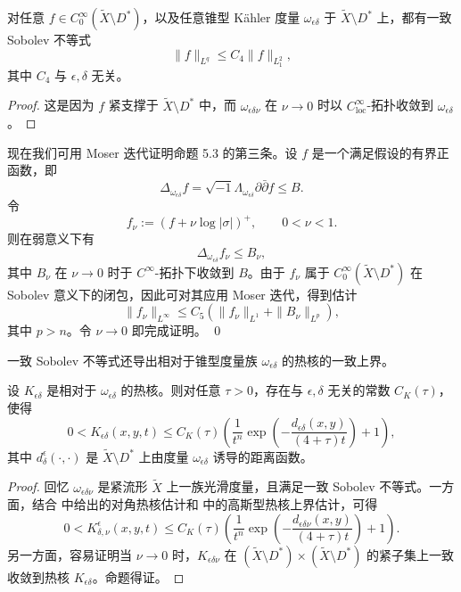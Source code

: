 \begin{lemma}
对任意 \(f\in C_0^\infty(\widetilde X\setminus D^*)\)，以及任意锥型 Kähler 度量 \(\omega_{\epsilon\delta}\) 于 \(\widetilde X\setminus D^*\) 上，都有一致 Sobolev 不等式
\[
\|f\|_{L^q}\le C_4\|f\|_{L_1^2},
\]
其中 \(C_4\) 与 \(\epsilon,\delta\) 无关。
\end{lemma}

\begin{proof}
这是因为 \(f\) 紧支撑于 \(\widetilde X\setminus D^*\) 中，而 \(\omega_{\epsilon\delta\nu}\) 在 \(\nu\to 0\) 时以 \(C^\infty_{\mathrm{loc}}\)-拓扑收敛到 \(\omega_{\epsilon\delta}\)。
\end{proof}

现在我们可用 Moser 迭代证明命题 5.3 的第三条。设 \(f\) 是一个满足假设的有界正函数，即
\[
\Delta_{\omega_{\epsilon\delta}}f
=
\sqrt{-1}\Lambda_{\omega_{\epsilon\delta}}\partial\bar\partial f
\le B.
\]
令
\[
f_\nu:=(f+\nu\log|\sigma|)^+,\qquad 0<\nu<1.
\]
则在弱意义下有
\[
\Delta_{\omega_{\epsilon\delta}}f_\nu\le B_\nu,
\]
其中 \(B_\nu\) 在 \(\nu\to 0\) 时于 \(C^\infty\)-拓扑下收敛到 \(B\)。由于 \(f_\nu\) 属于 \(C_0^\infty(\widetilde X\setminus D^*)\) 在 Sobolev 意义下的闭包，因此可对其应用 Moser 迭代，得到估计
\[
\|f_\nu\|_{L^\infty}\le C_5(\|f_\nu\|_{L^1}+\|B_\nu\|_{L^p}),
\]
其中 \(p>n\)。令 \(\nu\to 0\) 即完成证明。 \qed

一致 Sobolev 不等式还导出相对于锥型度量族 \(\omega_{\epsilon\delta}\) 的热核的一致上界。

\begin{proposition}
设 \(K_{\epsilon\delta}\) 是相对于 \(\omega_{\epsilon\delta}\) 的热核。则对任意 \(\tau>0\)，存在与 \(\epsilon,\delta\) 无关的常数 \(C_K(\tau)\)，使得
\[
0<K_{\epsilon\delta}(x,y,t)\le
C_K(\tau)
\left(
\frac1{t^n}\exp\left(-\frac{d_{\epsilon\delta}(x,y)}{(4+\tau)t}\right)+1
\right),
\]
其中 \(d^\epsilon_\delta(\cdot,\cdot)\) 是 \(\widetilde X\setminus D^*\) 上由度量 \(\omega_{\epsilon\delta}\) 诱导的距离函数。
\end{proposition}

\begin{proof}
回忆 \(\omega_{\epsilon\delta\nu}\) 是紧流形 \(\widetilde X\) 上一族光滑度量，且满足一致 Sobolev 不等式。一方面，结合 \cite{Ch-Li} 中给出的对角热核估计和 \cite[Theorem 1.1]{GrYan} 中的高斯型热核上界估计，可得
\[
0<K^\epsilon_{\delta,\nu}(x,y,t)\le
C_K(\tau)
\left(
\frac1{t^n}\exp\left(-\frac{d_{\epsilon\delta\nu}(x,y)}{(4+\tau)t}\right)+1
\right).
\]
另一方面，容易证明当 \(\nu\to 0\) 时，\(K_{\epsilon\delta\nu}\) 在 \((\widetilde X\setminus D^*)\times (\widetilde X\setminus D^*)\) 的紧子集上一致收敛到热核 \(K_{\epsilon\delta}\)。命题得证。
\end{proof}

